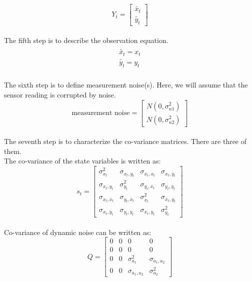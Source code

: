 \documentclass[12pt]{article}
\begin{document}
\begin{equation}
Y_t = 
\begin{bmatrix}
	\tilde{x_t} \\
	\tilde{y_t}
\end{bmatrix}
\label{eq:2d obs var}
\end{equation}
\\
The fifth step is to describe the observation equation.
\begin{align}
\begin{split}
	\tilde{x_t} = x_t \\
	\tilde{y_t} = y_t
\end{split}
\label{eq:2d obs eq}
\end{align}
\\
The sixth step is to define measurement noise(s). Here, we will assume that the sensor reading is corrupted by noise.
\begin{equation}
\text{measurement noise} = 
\begin{bmatrix}
	N(0,\sigma^2_{n1}) \\
	N(0,\sigma^2_{n2})
\end{bmatrix}
\label{eq:2d mes noise}
\end{equation}
\\
The seventh step is to characterize the co-variance matrices. There are three of them.  \\
The co-variance of the state variables is written as:
\begin{equation}
s_t = 
\begin{bmatrix}
	\sigma^2_{x_t} & \sigma_{x_t,y_t} & \sigma_{x_t,\dot{x_t}} & \sigma_{x_t,\dot{y_t}}  \\
	\sigma_{x_t,y_t} & \sigma^2_{y_t} & \sigma_{y_t,\dot{x_t}} & \sigma_{y_t,\dot{y_t}} \\
	\sigma_{x_t,\dot{x_t}} & \sigma_{y_t,\dot{x_t}} & \sigma^2_{\dot{x_t}} & \sigma_{\dot{x_t},\dot{y_t}} \\
	\sigma_{x_t,\dot{y_t}} & \sigma_{y_t,\dot{y_t}} & \sigma_{\dot{x_t},\dot{y_t}} & \sigma^2_{\dot{y_t}}
\end{bmatrix}
\label{eq:2d state co-var}
\end{equation}
\\
Co-variance of dynamic noise can be written as:
\begin{equation}
Q = 
\begin{bmatrix}
	0 & 0 & 0 & 0\\
	0 & 0 & 0 & 0\\
	0 & 0 & \sigma^2_{a_1} & \sigma_{a_1,a_2} \\
	0 & 0 & \sigma_{a_1,a_2} & \sigma^2_{a_2}
\end{bmatrix}
\label{eq:2d dyn co-var}
\end{equation}
\end{document}

